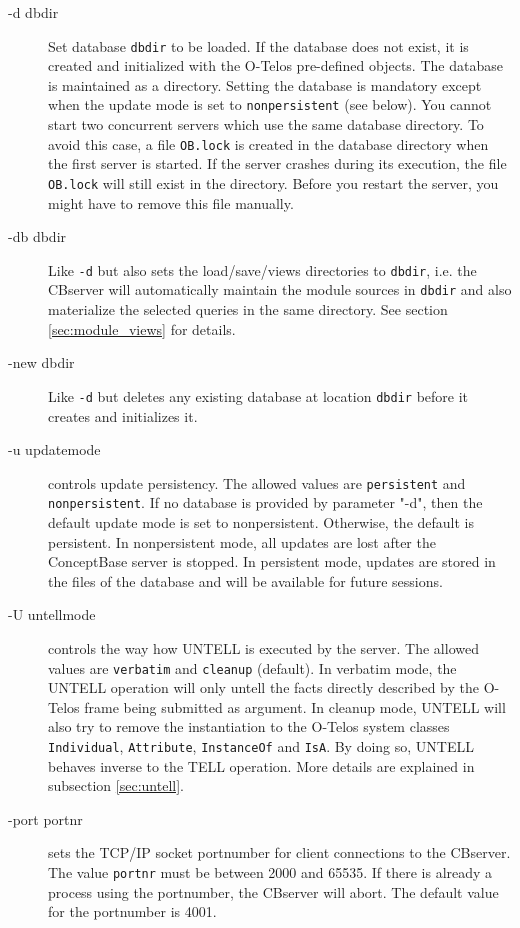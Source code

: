\begin{description}
\item[-d dbdir] Set database {\tt dbdir} to be loaded. If the database does not exist, it
is created and initialized with the O-Telos pre-defined objects.
The database is maintained as a directory. Setting the database is mandatory
except when the update mode is set to {\tt nonpersistent} (see below).
You cannot start two concurrent servers which use the same database directory.
To avoid this case, a file {\tt OB.lock} is created in the database directory
when the first server is started. If the server crashes during its execution,
the file {\tt OB.lock} will still exist in the directory. Before you
restart the server, you might have to remove this file manually.


\item[-db dbdir] Like {\tt -d} but also sets the load/save/views directories to
{\tt dbdir}, i.e. the CBserver will automatically maintain the module sources
in {\tt dbdir} and also materialize the selected queries in the same directory.
See section \ref{sec:module_views} for details.

\item[-new dbdir] Like {\tt -d} but deletes any existing database at location
{\tt dbdir} before it creates and initializes it.

\item[-u updatemode] controls update persistency.
The allowed values are {\tt persistent}  and {\tt non\-per\-si\-stent}.
If no database is provided by parameter "-d", then the default
update mode is set to nonpersistent. Otherwise, the default is
persistent.
In nonpersistent mode, all updates are lost after the ConceptBase server
is stopped. In persistent mode, updates are stored in the files of the database and
will be available for future sessions.

\item[-U untellmode] controls the way how UNTELL is executed by the server.
The allowed values are {\tt verba\-tim} and {\tt cleanup} (default).
In verbatim mode, the UNTELL operation will only untell the facts 
directly described by the O-Telos frame being submitted as argument.
In cleanup mode, UNTELL will also try to remove the instantiation to the
O-Telos system classes {\tt Individual}, {\tt Attribute}, {\tt InstanceOf} and {\tt IsA}. 
By doing so, UNTELL behaves inverse to the TELL
operation. More details are explained in subsection \ref{sec:untell}.

\item[-port portnr] sets the TCP/IP socket portnumber for client connections
to the CBserver. The value {\tt portnr}
must be between 2000 and 65535. If there is already a process using the
portnumber, the CBserver will abort. The default value for
the portnumber is 4001.


\end{description}
